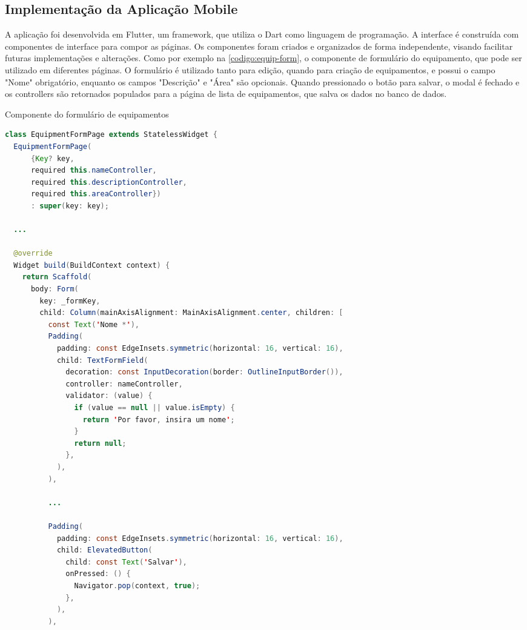 \subsection{Implementação da Aplicação Mobile}\label{subsec:aplicacao}

A aplicação foi desenvolvida em Flutter, um framework, que utiliza o Dart como linguagem de programação. A interface é construída com componentes de interface para compor as páginas. Os componentes foram criados e organizados de forma independente, visando facilitar futuras implementações e alterações. Como por exemplo na \autoref{codigo:equip-form}, o componente de formulário do equipamento, que pode ser utilizado em diferentes páginas. O formulário é utilizado tanto para edição, quando para criação de equipamentos, e possui o campo "Nome" obrigatório, enquanto os campos "Descrição" e "Área" são opcionais. Quando pressionado o botão para salvar, o modal é fechado e os controllers são retornados populados para a página de lista de equipamentos, que salva os dados no banco de dados.

\begin{sourcecode}[H]
  \caption{\label{codigo:equip-form}Componente do formulário de equipamentos}
  \begin{lstlisting}[frame=single, language=Java]
class EquipmentFormPage extends StatelessWidget {
  EquipmentFormPage(
      {Key? key,
      required this.nameController,
      required this.descriptionController,
      required this.areaController})
      : super(key: key);

  ...

  @override
  Widget build(BuildContext context) {
    return Scaffold(
      body: Form(
        key: _formKey,
        child: Column(mainAxisAlignment: MainAxisAlignment.center, children: [
          const Text('Nome *'),
          Padding(
            padding: const EdgeInsets.symmetric(horizontal: 16, vertical: 16),
            child: TextFormField(
              decoration: const InputDecoration(border: OutlineInputBorder()),
              controller: nameController,
              validator: (value) {
                if (value == null || value.isEmpty) {
                  return 'Por favor, insira um nome';
                }
                return null;
              },
            ),
          ),
		  
          ...
		  
          Padding(
            padding: const EdgeInsets.symmetric(horizontal: 16, vertical: 16),
            child: ElevatedButton(
              child: const Text('Salvar'),
              onPressed: () {
                Navigator.pop(context, true);
              },
            ),
          ),
\end{lstlisting}
  \fonte{}
\end{sourcecode}

